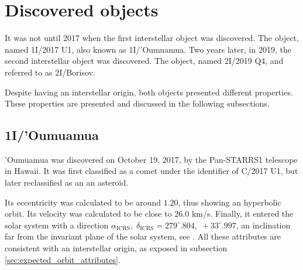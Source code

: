 \section{Discovered objects}

It was not until 2017 when the first interstellar object was discovered. The
object, named 1I/2017 U1, also known as 1I/'Oumuamua. Two years later, in 2019,
the second interstellar object was discovered. The object, named 2I/2019 Q4, and
referred to as 2I/Borisov. 

Despite having an interstellar origin, both objects presented different
properties. These properties are presented and discussed in the following
subsections.

\subsection{1I/'Oumuamua}

'Oumuamua was discovered on October 19, 2017, by the Pan-STARRS1 telescope in
Hawaii. It was first classified as a comet under the identifier of C/2017 U1,
but later reclassified as an an asteroid.

Its eccentricity was calculated to be around $1.20$, thus showing an hyperbolic
orbit. Its velocity was calculated to be close to $26.0$ km/s. Finally, it
entered the solar system with a direction $\alpha_{\text{ICRS}},\;
\delta_{\text{ICRS}} = 279^\circ.804,\; +33^\circ.997$, an inclination far from
the invariant plane of the solar system, see \cite{mamajek2017}. All these
attributes are consistent with an interstellar origin, as exposed in subsection
\ref{sec:expected_orbit_attributes}.


%
%
%
%
